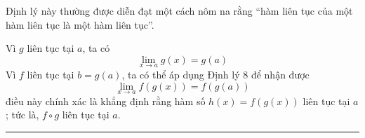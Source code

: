 \vspace{10pt}

\indent
Định lý này thường được diễn đạt một cách nôm na rằng “hàm liên tục của một hàm liên tục là một hàm liên tục”.

\vspace{12pt}

\quad Vì $g$ liên tục tại $a$, ta có
\[
\lim_{x \to a} g(x) = g(a)
\]
Vì $f$ liên tục tại $b = g(a)$, ta có thể áp dụng Định lý 8 để nhận được
\[
\lim_{x \to a} f(g(x)) = f(g(a))
\]
điều này chính xác là khẳng định rằng hàm số $h(x) = f(g(x))$ liên tục tại $a$; tức là, $f \circ g$ liên tục tại $a$. \hfill \textcolor{stewartred}{\rule{1.2ex}{1.2ex}}
